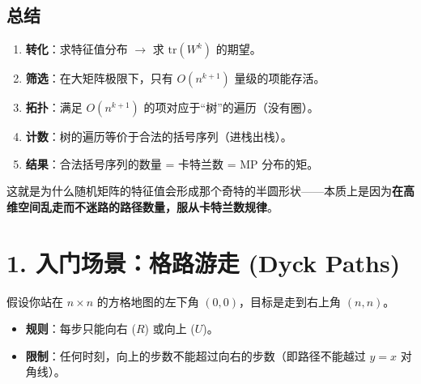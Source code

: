 \documentclass[11pt,a4paper]{ctexart}
\theoremstyle{definition}
\theoremstyle{remark}
\begin{document}
\subsection{总结}
\begin{enumerate}
    \item \textbf{转化}：求特征值分布 $\to$ 求 $\text{tr}(W^k)$ 的期望。
    \item \textbf{筛选}：在大矩阵极限下，只有 $O(n^{k+1})$ 量级的项能存活。
    \item \textbf{拓扑}：满足 $O(n^{k+1})$ 的项对应于“树”的遍历（没有圈）。
    \item \textbf{计数}：树的遍历等价于合法的括号序列（进栈出栈）。
    \item \textbf{结果}：合法括号序列的数量 = 卡特兰数 = MP 分布的矩。
\end{enumerate}
这就是为什么随机矩阵的特征值会形成那个奇特的半圆形状——本质上是因为\textbf{在高维空间乱走而不迷路的路径数量，服从卡特兰数规律}。


\section{1. 入门场景：格路游走 (Dyck Paths)}

假设你站在 $n \times n$ 的方格地图的左下角 $(0,0)$，目标是走到右上角 $(n,n)$。
\begin{itemize}
    \item \textbf{规则}：每步只能向右 ($R$) 或向上 ($U$)。
    \item \textbf{限制}：任何时刻，向上的步数不能超过向右的步数（即路径不能越过 $y=x$ 对角线）。
\end{itemize}
\end{document}
